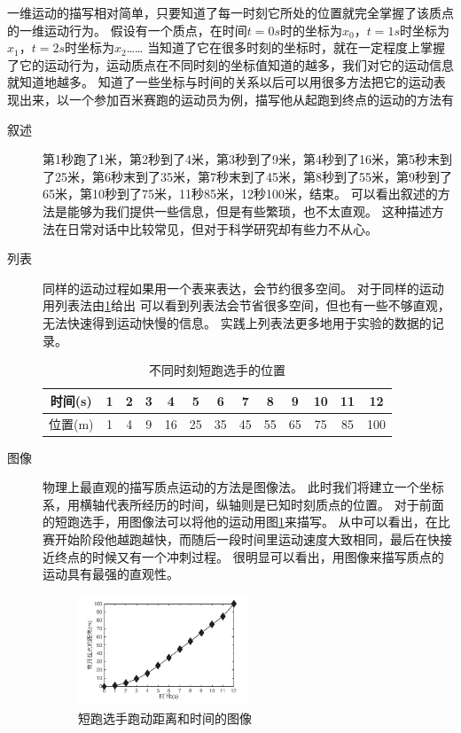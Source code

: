 一维运动的描写相对简单，只要知道了每一时刻它所处的位置就完全掌握了该质点的一维运动行为。
假设有一个质点，在时间$t=0\unit{s}$时的坐标为$x_0$，$t=1\unit{s}$时坐标为$x_1$，$t=2\unit{s}$时坐标为$x_2$……
当知道了它在很多时刻的坐标时，就在一定程度上掌握了它的运动行为，运动质点在不同时刻的坐标值知道的越多，我们对它的运动信息就知道地越多。
知道了一些坐标与时间的关系以后可以用很多方法把它的运动表现出来，以一个参加百米赛跑的运动员为例，描写他从起跑到终点的运动的方法有
\begin{description}
\item[叙述]  第1秒跑了1米，第2秒到了4米，第3秒到了9米，第4秒到了16米，第5秒末到了25米，第6秒末到了35米，第7秒末到了45米，第8秒到了55米，第9秒到了65米，第10秒到了75米，11秒85米，12秒100米，结束。
可以看出叙述的方法是能够为我们提供一些信息，但是有些繁琐，也不太直观。
这种描述方法在日常对话中比较常见，但对于科学研究却有些力不从心。
\item[列表] 同样的运动过程如果用一个表来表达，会节约很多空间。
对于同样的运动用列表法由\ref{tab: 不同时刻短跑选手的位置}给出
可以看到列表法会节省很多空间，但也有一些不够直观，无法快速得到运动快慢的信息。
实践上列表法更多地用于实验的数据的记录。
\begin{table}[htbp]
\begin{center}
\begin{tabular}{|c|c c c c c c c c c c c c|}
\hline
时间(s)&1&2&3&4&5&6&7&8&9&10&11&12\\
\hline
位置(m)&1&4&9&16&25&35&45&55&65&75&85&100\\
\hline

\end{tabular}
\caption{不同时刻短跑选手的位置}
\end{center}
\label{tab: 不同时刻短跑选手的位置}
\end{table}



\item[图像]
物理上最直观的描写质点运动的方法是图像法。
此时我们将建立一个坐标系，用横轴代表所经历的时间，纵轴则是已知时刻质点的位置。
对于前面的短跑选手，用图像法可以将他的运动用图\ref{fig: 短跑选手跑动距离和时间的图像}来描写。
从中可以看出，在比赛开始阶段他越跑越快，而随后一段时间里运动速度大致相同，最后在快接近终点的时候又有一个冲刺过程。
很明显可以看出，用图像来描写质点的运动具有最强的直观性。
\begin{figure}[htbp]
\begin{center}
\includegraphics[width=0.5\textwidth]{images/motion-race.pdf}

\caption{短跑选手跑动距离和时间的图像}
\label{fig: 短跑选手跑动距离和时间的图像}
\end{center}
\end{figure}
\end{description}

